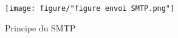 \documentclass[a4paper,12pt,french]{report} %
\begin{document}
\begin{itemize}
\end{itemize}

\begin{figure}[H]
\centering
\texttt{[image: figure/"figure envoi SMTP.png"]}
\caption{Principe du SMTP}
\label{Principer du SMTP}
\end{figure}
\end{document}
